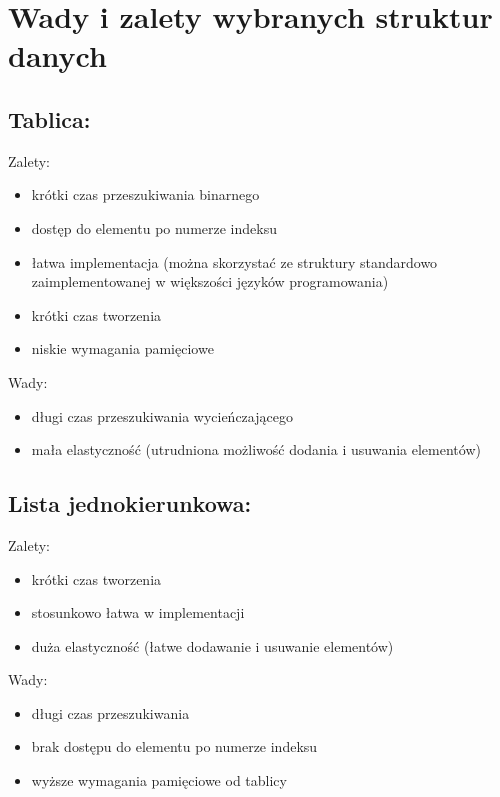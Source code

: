 \documentclass[polish,polish,a4paper]{article}
\begin{document}
\section{Wady i zalety wybranych struktur danych}
\subsection{Tablica:}
Zalety:
\begin{itemize}
	\item krótki czas przeszukiwania binarnego
	\item dostęp do elementu po numerze indeksu
	\item łatwa implementacja (można skorzystać ze struktury standardowo zaimplementowanej w większości języków programowania)
	\item krótki czas tworzenia
	\item niskie wymagania pamięciowe
\end{itemize}
Wady:
\begin{itemize}
	\item długi czas przeszukiwania wycieńczającego
	\item mała elastyczność (utrudniona możliwość dodania i usuwania elementów)
\end{itemize}


\subsection{Lista jednokierunkowa:}
Zalety:
\begin{itemize}
	\item krótki czas tworzenia
	\item stosunkowo łatwa w implementacji 
	\item duża elastyczność (łatwe dodawanie i usuwanie elementów)
\end{itemize}
Wady:
\begin{itemize}
	\item długi czas przeszukiwania
	\item brak dostępu do elementu po numerze indeksu
	\item wyższe wymagania pamięciowe od tablicy
\end{itemize}
\end{document}

